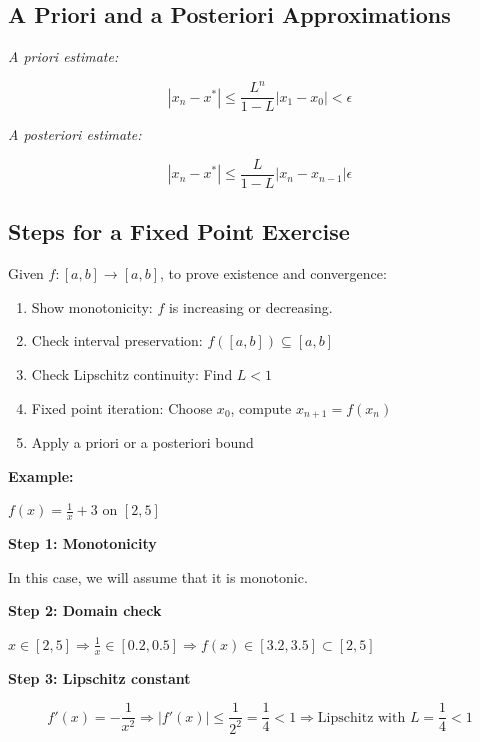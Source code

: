 \subsection{A Priori and a Posteriori Approximations}

\emph{A priori estimate:}

\[
    |x_n - x^*| \le \frac{L^n}{1 - L} |x_1 - x_0| < \epsilon
\]

\emph{A posteriori estimate:}

\[
    |x_n - x^*| \le \frac{L}{1 - L} |x_n - x_{n-1}| \epsilon
\]

\subsection{Steps for a Fixed Point Exercise}

Given \(f: [a, b] \to [a, b]\), to prove existence and convergence:

\begin{enumerate}

    \item Show monotonicity: \(f\) is increasing or decreasing.

    \item Check interval preservation: \(f([a, b]) \subseteq [a, b]\)

    \item Check Lipschitz continuity: Find \(L < 1\)

    \item Fixed point iteration: Choose \(x_0\), compute \(x_{n+1} = f(x_n)\)

    \item Apply a priori or a posteriori bound

\end{enumerate}

\textbf{Example:} 

\(f(x) = \frac{1}{x} + 3\) on \([2, 5]\)

\textbf{Step 1: Monotonicity}

In this case, we will assume that it is monotonic. 

\textbf{Step 2: Domain check} 
 
 \(x \in [2, 5] \Rightarrow \frac{1}{x} \in [0.2, 0.5] \Rightarrow f(x) \in [3.2, 3.5] \subset [2, 5]\)

 \textbf{Step 3: Lipschitz constant}

\[
    f'(x) = -\frac{1}{x^2} \Rightarrow |f'(x)| \le \frac{1}{2^2} = \frac{1}{4} < 1
    \Rightarrow \text{Lipschitz with } L = \frac{1}{4} < 1
\]



